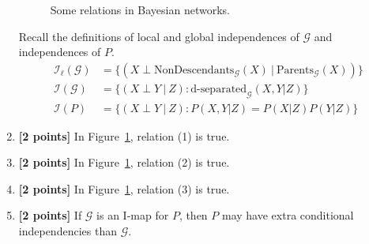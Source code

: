 \documentclass{article}
\newcommand{\Gcal}{\mathcal{G}}
\newcommand{\Ical}{\mathcal{I}}
\begin{document}
\begin{enumerate}
\begin{figure}[h]
\centering
{}
\caption{Some relations in Bayesian networks.}
\label{fig:relations-bayesnet}
\end{figure}



Recall the definitions of local and global independences of $ \Gcal $ and independences of $ P $. 
\begin{align}
\Ical_\ell (\Gcal) & = \{ (X \perp \text{NonDescendants}_\Gcal (X) \ |\  \text{Parents}_\Gcal (X)) \}   \\
\Ical (\Gcal) & = \{ (X \perp Y \ |\  Z): \text{d-separated}_\Gcal (X, Y | Z) \}  \\
\Ical (P) & = \{ (X \perp Y \ | \ Z): P(X, Y | Z) = P(X | Z) P(Y | Z)  \} 
\end{align}



\item \textbf{[2 points]} In Figure~\ref{fig:relations-bayesnet}, relation (1) is true.





\item \textbf{[2 points]} In Figure~\ref{fig:relations-bayesnet}, relation (2) is true.






\item \textbf{[2 points]} In Figure~\ref{fig:relations-bayesnet}, relation (3) is true.







\item \textbf{[2 points]} If $ \Gcal $ is an I-map for $ P $, then $ P $ may have extra conditional independencies than $ \Gcal $.



\end{enumerate}
\end{document}
